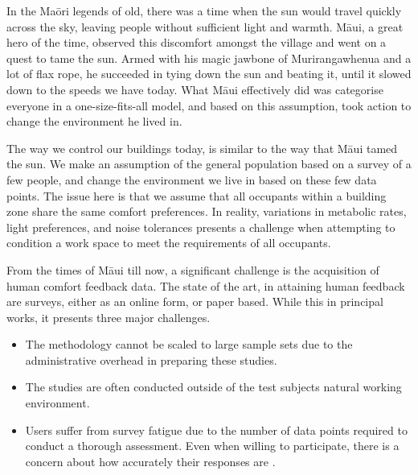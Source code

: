 
In the Ma\={o}ri legends of old, there was a time when the sun would travel quickly across the sky, leaving people without sufficient light and warmth. M\={a}ui, a great hero of the time, observed this discomfort amongst the village and went on a quest to tame the sun. Armed with his magic jawbone of Murirangawhenua and a lot of flax rope, he succeeded in tying down the sun and beating it, until it slowed down to the speeds we have today. What M\={a}ui effectively did was categorise everyone in a one-size-fits-all model, and based on this assumption, took action to change the environment he lived in. 

The way we control our buildings today, is similar to the way that M\={a}ui tamed the sun. We make an assumption of the general population based on a survey of a few people, and change the environment we live in based on these few data points. The issue here is that we assume that all occupants within a building zone share the same comfort preferences. In reality, variations in metabolic rates, light preferences, and noise tolerances presents a challenge when attempting to condition a work space to meet the requirements of all occupants. 



From the times of M\={a}ui till now, a significant challenge is the acquisition of human comfort feedback data. The state of the art, in attaining human feedback are surveys, either as an online form, or paper based. While this in principal works, it presents three major challenges.

\begin{itemize}
  \item The methodology cannot be scaled to large sample sets due to the administrative overhead in preparing these studies.
  \item The studies are often conducted outside of the test subjects natural working environment.
  \item Users suffer from survey fatigue \cite{porter2004multiple} due to the number of data points required to conduct a thorough assessment. Even when willing to participate, there is a concern about how accurately their responses are \cite{Clear2018}.
\end{itemize}



